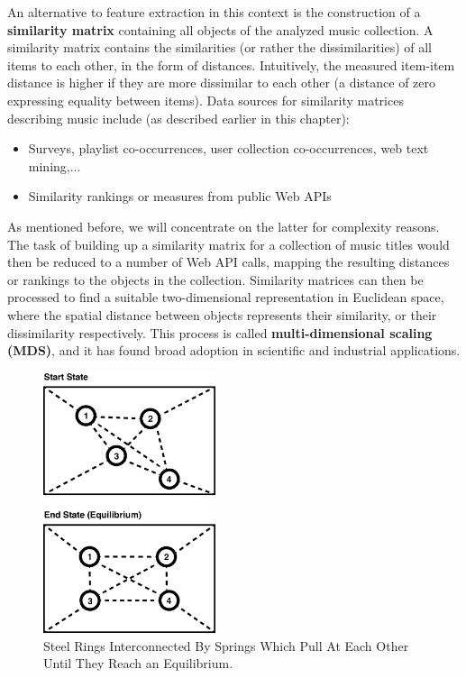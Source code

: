 An alternative to feature extraction in this context is the construction of a 
\textbf{similarity matrix} containing all objects of the analyzed music collection. A similarity matrix contains
the similarities (or rather the dissimilarities) of all items to each other, in the form of distances.
Intuitively, the measured item-item distance is higher if they are more dissimilar to each other (a distance of
zero expressing equality between items). Data sources for similarity matrices describing music include 
(as described earlier in this chapter):
\begin{itemize}
	\item Surveys, playlist co-occurrences, user collection co-occurrences, web text mining,... 
	\item Similarity rankings or measures from public Web APIs
\end{itemize}
As mentioned before, we will concentrate on the latter for complexity reasons. The task of building up a 
similarity matrix for a collection of music titles would then be reduced to a number of Web API calls, mapping the
resulting distances or rankings to the objects in the collection. Similarity matrices can then be processed
to find a suitable two-dimensional representation in Euclidean space, where the spatial distance between
objects represents their similarity, or their dissimilarity respectively. This process is called \textbf{multi-dimensional scaling (MDS)}, and it has found broad adoption in scientific and industrial applications. 

\begin{figure}[H]
  \centering
    \includegraphics[width=0.45\textwidth]{figures/spring_model}
  \caption{Steel Rings Interconnected By Springs Which Pull At Each Other Until They Reach an Equilibrium.}
  \label{fig:spring_model}
\end{figure}


